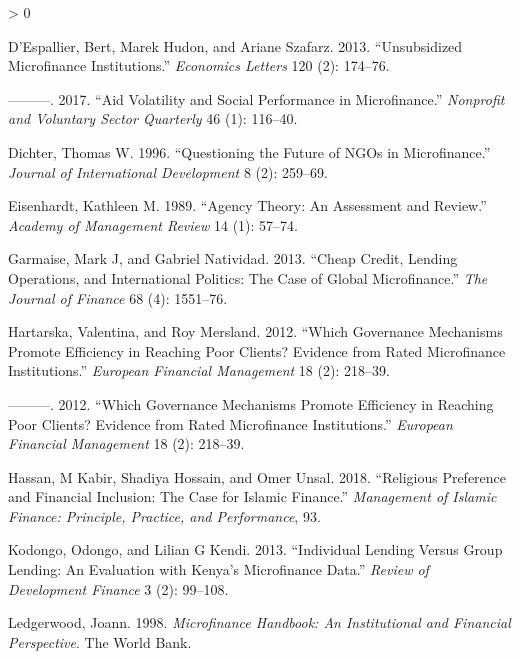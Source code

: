 \documentclass[
]{article}
\newlength{\cslhangindent}
\newenvironment{CSLReferences}[2] %
 {%
  \setlength{\parindent}{0pt}
  \ifodd #1 \everypar{\setlength{\hangindent}{\cslhangindent}}\ignorespaces\fi
  \ifnum #2 > 0
  \setlength{\parskip}{#2\baselineskip}
  \fi
 }%
 {}
\begin{document}
\begin{CSLReferences}{1}{0}
\leavevmode\hypertarget{ref-d2013unsubsidized}{}%
D'Espallier, Bert, Marek Hudon, and Ariane Szafarz. 2013.
{``Unsubsidized Microfinance Institutions.''} \emph{Economics Letters}
120 (2): 174--76.

\leavevmode\hypertarget{ref-d2017aid}{}%
---------. 2017. {``Aid Volatility and Social Performance in
Microfinance.''} \emph{Nonprofit and Voluntary Sector Quarterly} 46 (1):
116--40.

\leavevmode\hypertarget{ref-dichter1996questioning}{}%
Dichter, Thomas W. 1996. {``Questioning the Future of NGOs in
Microfinance.''} \emph{Journal of International Development} 8 (2):
259--69.

\leavevmode\hypertarget{ref-eisenhardt1989agency}{}%
Eisenhardt, Kathleen M. 1989. {``Agency Theory: An Assessment and
Review.''} \emph{Academy of Management Review} 14 (1): 57--74.

\leavevmode\hypertarget{ref-garmaise2013cheap}{}%
Garmaise, Mark J, and Gabriel Natividad. 2013. {``Cheap Credit, Lending
Operations, and International Politics: The Case of Global
Microfinance.''} \emph{The Journal of Finance} 68 (4): 1551--76.

\leavevmode\hypertarget{ref-hartarska2012governance}{}%
Hartarska, Valentina, and Roy Mersland. 2012. {``Which Governance
Mechanisms Promote Efficiency in Reaching Poor Clients? Evidence from
Rated Microfinance Institutions.''} \emph{European Financial Management}
18 (2): 218--39.

\leavevmode\hypertarget{ref-hartarska2012governance}{}%
---------. 2012. {``Which Governance Mechanisms Promote Efficiency in
Reaching Poor Clients? Evidence from Rated Microfinance Institutions.''}
\emph{European Financial Management} 18 (2): 218--39.

\leavevmode\hypertarget{ref-hassan2018religious}{}%
Hassan, M Kabir, Shadiya Hossain, and Omer Unsal. 2018. {``Religious
Preference and Financial Inclusion: The Case for Islamic Finance.''}
\emph{Management of Islamic Finance: Principle, Practice, and
Performance}, 93.

\leavevmode\hypertarget{ref-kodongo2013individual}{}%
Kodongo, Odongo, and Lilian G Kendi. 2013. {``Individual Lending Versus
Group Lending: An Evaluation with Kenya's Microfinance Data.''}
\emph{Review of Development Finance} 3 (2): 99--108.

\leavevmode\hypertarget{ref-ledgerwood1998microfinance}{}%
Ledgerwood, Joann. 1998. \emph{Microfinance Handbook: An Institutional
and Financial Perspective}. The World Bank.


\end{CSLReferences}
\end{document}
